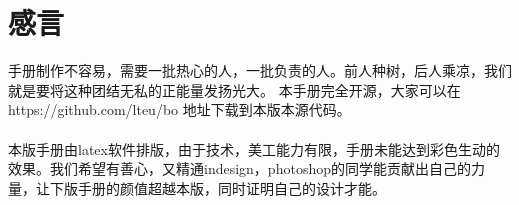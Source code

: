 
% 
%
%
%








\clearpage{\pagestyle{empty}\cleardoublepage}
\chapter*{感言}
\thispagestyle{empty}

手册制作不容易，需要一批热心的人，一批负责的人。前人种树，后人乘凉，我们就是要将这种团结无私的正能量发扬光大。
本手册完全开源，大家可以在 https://github.com/lteu/bo 地址下载到本版本源代码。\\\\
\noindent 本版手册由latex软件排版，由于技术，美工能力有限，手册未能达到彩色生动的效果。我们希望有善心，又精通indesign，photoshop的同学能贡献出自己的力量，让下版手册的颜值超越本版，同时证明自己的设计才能。